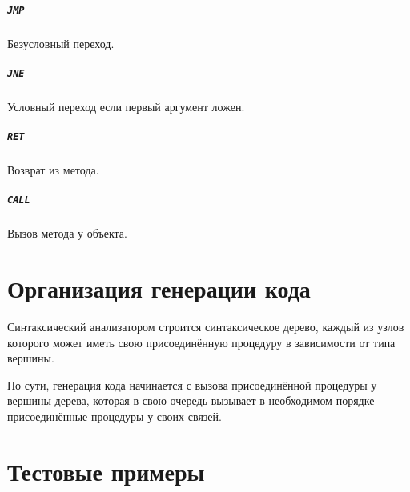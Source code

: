 \documentclass[a4paper,12pt,notitlepage,pdftex]{scrreprt}
\begin{document}
    \paragraph{\verb"JMP"} Безусловный переход.
    \paragraph{\verb"JNE"} Условный переход если первый аргумент ложен.
    \paragraph{\verb"RET"} Возврат из метода.
    \paragraph{\verb"CALL"} Вызов метода у объекта.
\chapter{Организация генерации кода}
    Синтаксический анализатором строится синтаксическое дерево, каждый из узлов которого может иметь свою
    присоединённую процедуру в зависимости от типа вершины.

    По сути, генерация кода начинается с вызова присоединённой процедуры у вершины дерева, которая в свою очередь
    вызывает в необходимом порядке присоединённые процедуры у своих связей.
\chapter{Тестовые примеры}
\label{chap:fourth}
        
\end{document}
